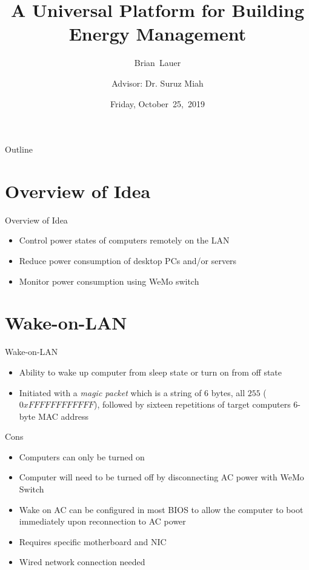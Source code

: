 \documentclass{beamer}
\title[]{A Universal Platform for Building Energy Management}
\author[B.~Lauer]{Brian~Lauer\\\and
Advisor: Dr. Suruz Miah}
\institute[Bradley University] %
{
  Department of Electrical and Computer Engineering\\
  Bradley University\\
  1501 W. Bradley Avenue\\
  Peoria, IL, 61625, USA
}
\date[October~25,~2019]{Friday, October~25,~2019}
\begin{document}
\begin{frame}
  \titlepage
\end{frame}

\begin{frame}{Outline}
  \tableofcontents
\end{frame}

\section{Overview of Idea}

\begin{frame}{Overview of Idea}
\begin{itemize}
\item Control power states of computers remotely on the LAN
\item Reduce power consumption of desktop PCs and/or servers
\item Monitor power consumption using WeMo switch
\end{itemize}
\end{frame}

\section{Wake-on-LAN}
\begin{frame}{Wake-on-LAN}
\begin{itemize}
\item Ability to wake up computer from sleep state or turn on from off state
\item Initiated with a \textit{magic packet} which is a string of $6$ bytes, all $255$ ($0xFFFFFFFFFFFF$), followed by sixteen repetitions of target computers 6-byte MAC address
\end{itemize}
\begin{block}{Cons}
\begin{itemize}
\item Computers can only be turned on
\item Computer will need to be turned off by disconnecting AC power with WeMo Switch
\item Wake on AC can be configured in most BIOS to allow the computer to boot immediately upon reconnection to AC power
\item Requires specific motherboard and NIC
\item Wired network connection needed
\end{itemize}
\end{block}
\end{frame}
\end{document}

